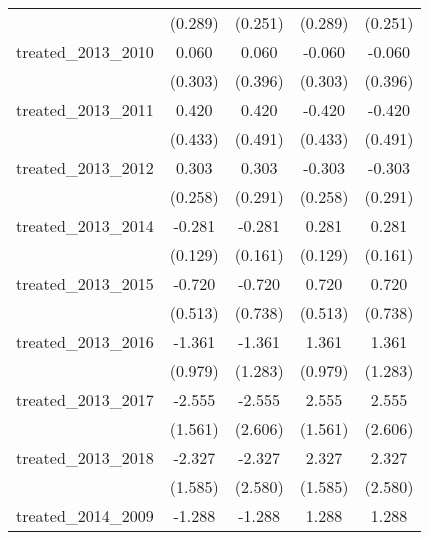 {\begin{tabular}{l*{4}{c}}
            &     (0.289)         &     (0.251)         &     (0.289)         &     (0.251)         \\
[1em]
treated\_2013\_2010&       0.060         &       0.060         &      -0.060         &      -0.060         \\
            &     (0.303)         &     (0.396)         &     (0.303)         &     (0.396)         \\
[1em]
treated\_2013\_2011&       0.420         &       0.420         &      -0.420         &      -0.420         \\
            &     (0.433)         &     (0.491)         &     (0.433)         &     (0.491)         \\
[1em]
treated\_2013\_2012&       0.303         &       0.303         &      -0.303         &      -0.303         \\
            &     (0.258)         &     (0.291)         &     (0.258)         &     (0.291)         \\
[1em]
treated\_2013\_2014&      -0.281\sym{*}  &      -0.281         &       0.281\sym{*}  &       0.281         \\
            &     (0.129)         &     (0.161)         &     (0.129)         &     (0.161)         \\
[1em]
treated\_2013\_2015&      -0.720         &      -0.720         &       0.720         &       0.720         \\
            &     (0.513)         &     (0.738)         &     (0.513)         &     (0.738)         \\
[1em]
treated\_2013\_2016&      -1.361         &      -1.361         &       1.361         &       1.361         \\
            &     (0.979)         &     (1.283)         &     (0.979)         &     (1.283)         \\
[1em]
treated\_2013\_2017&      -2.555         &      -2.555         &       2.555         &       2.555         \\
            &     (1.561)         &     (2.606)         &     (1.561)         &     (2.606)         \\
[1em]
treated\_2013\_2018&      -2.327         &      -2.327         &       2.327         &       2.327         \\
            &     (1.585)         &     (2.580)         &     (1.585)         &     (2.580)         \\
[1em]
treated\_2014\_2009&      -1.288         &      -1.288         &       1.288         &       1.288         \\

\end{tabular}}
